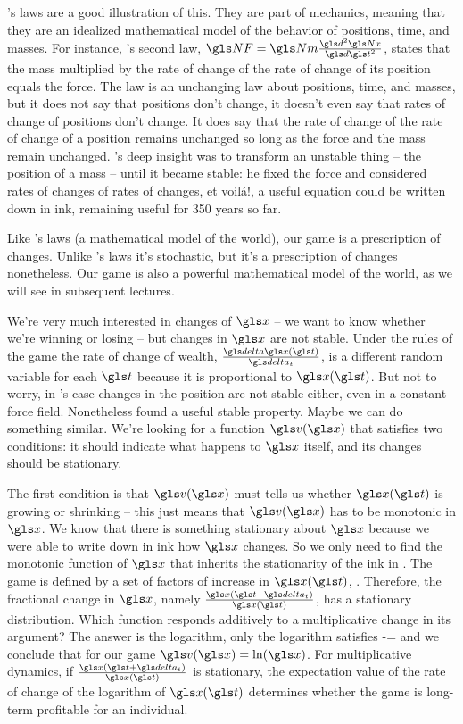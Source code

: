 's laws are a good illustration of this. They are part of mechanics, meaning that they
are an idealized mathematical model of the behavior of positions, time, and masses. 
For instance, 's second law, $\NF=\Nm \frac{\gd^2 \Nx}{\gd\t^2}$, states that the mass multiplied by 
the rate of change of the rate of change of its position equals the force. The law is an unchanging 
law about positions, time, and masses, but it does not say that positions don't change, it doesn't even say 
that rates of change of positions don't change. It does say that the rate of change of the 
rate of change of a position remains unchanged so long as the force and the mass 
remain unchanged. 's deep insight was to transform an unstable thing -- the position of a mass --
until it became stable: he fixed the force and considered rates of changes of rates of changes, et 
voil\'a!, a useful equation could be written down in ink, remaining useful for 350 years so far.

Like 's laws (a mathematical model of the world), our game is a prescription of changes. 
Unlike 's laws it's stochastic, but it's a prescription of changes nonetheless. 
Our game is also a powerful mathematical model of the world, as we will see in subsequent lectures. 

We're very much interested in changes of $\x$ -- we want to know 
whether we're winning or losing -- but changes in $\x$ are not stable. 
Under the rules of the game the rate of change of wealth, $\frac{\d \x(\t)}{\dt}$, is a different 
random variable for each $\t$ because it is proportional to $\x(\t)$. But not to worry, 
in 's case changes in the position are not stable either, even in a 
constant force field. Nonetheless  found a useful stable property. 
Maybe we can do something similar. We're looking for a function $\gv(\x)$ that satisfies two conditions: 
it should indicate what happens to $\x$ itself, and its changes should be stationary.

The first condition is that $\gv(\x)$ must tells us 
whether $\x(\t)$ is growing or shrinking -- this just means that $\gv(\x)$ has to 
be monotonic in $\x$. We know that there is something stationary
about $\x$ because we were able to write down in ink how $\x$ changes. So we only need 
to find the monotonic function of $\x$ that inherits the stationarity of the ink in .
The game is defined by a set of factors of increase in $\x(\t)$, . Therefore, the fractional change in $\x$, namely
$\frac{\x(\t+\dt)}{\x(\t)}$, has a stationary distribution. Which function responds additively to a multiplicative change in its argument? 
The answer is the logarithm, \ie
only the logarithm satisfies
\be
\gv[\x(\t+\dt)]-\gv[\x(\t)]=\gv \left[\frac{\x(\t+\dt)}{\x(\t)}\right]
\ee
and we conclude that for our game $\gv(\x)=\ln(\x)$.
For multiplicative dynamics, \ie if $\frac{\x(\t+\dt)}{\x(\t)}$ is stationary, the expectation 
value of the rate of change of the logarithm of $\x(\t)$ determines whether the game is long-term profitable 
for an individual.

